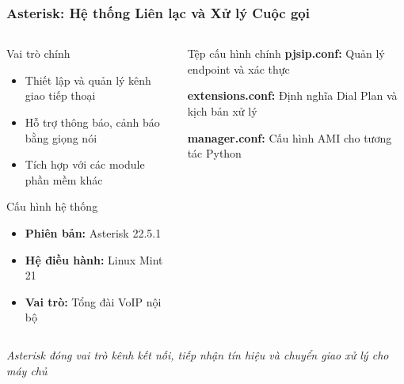\begin{frame}
\frametitle{Asterisk: Hệ thống Liên lạc và Xử lý Cuộc gọi}

\begin{columns}[t]
\begin{column}{0.5\textwidth}
\begin{block}{Vai trò chính}
\begin{itemize}
\item Thiết lập và quản lý kênh giao tiếp thoại
\item Hỗ trợ thông báo, cảnh báo bằng giọng nói
\item Tích hợp với các module phần mềm khác
\end{itemize}
\end{block}

\begin{alertblock}{Cấu hình hệ thống}
\begin{itemize}
\item \textbf{Phiên bản:} Asterisk 22.5.1
\item \textbf{Hệ điều hành:} Linux Mint 21
\item \textbf{Vai trò:} Tổng đài VoIP nội bộ
\end{itemize}
\end{alertblock}
\end{column}

\begin{column}{0.45\textwidth}
\begin{exampleblock}{Tệp cấu hình chính}
\textbf{pjsip.conf:} Quản lý endpoint và xác thực

\textbf{extensions.conf:} Định nghĩa Dial Plan và kịch bản xử lý

\textbf{manager.conf:} Cấu hình AMI cho tương tác Python
\end{exampleblock}
\end{column}
\end{columns}

\vspace{0.3cm}
\begin{center}
\textit{\small Asterisk đóng vai trò kênh kết nối, tiếp nhận tín hiệu và chuyển giao xử lý cho máy chủ}
\end{center}

\end{frame}

